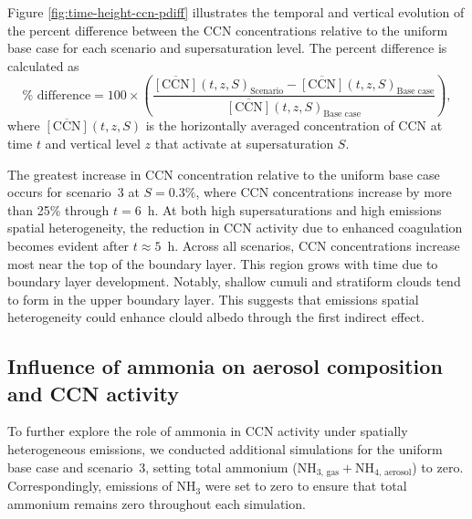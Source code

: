 \documentclass[journal abbreviation, manuscript]{copernicus}
\begin{document}
Figure \ref{fig:time-height-ccn-pdiff} illustrates the temporal and
vertical evolution of the percent difference between the CCN
concentrations relative to the uniform base case for each scenario and
supersaturation level. The percent difference is calculated as
\begin{equation}
    \% \text{ difference} = 100\times\left(\frac{\overline{[\text{CCN}]}(t, z, S)_{\text{Scenario}} - \overline{[\text{CCN}]}(t, z, S)_{\text{Base case}}}{\overline{[\text{CCN}]}(t, z, S)_{\text{Base case}}}\right),
\end{equation}
where $\overline{[\text{CCN}]}(t, z,S)$ is the horizontally averaged
concentration of CCN at time $t$ and vertical level $z$ that activate
at supersaturation $S$.

The greatest increase in CCN concentration relative to the uniform
base case occurs for scenario~3 at $S=0.3\%$, where CCN concentrations
increase by more than 25\% through $t=6$~h. At both high
supersaturations and high emissions spatial heterogeneity, the
reduction in CCN activity due to enhanced coagulation becomes evident
after $t\approx5$~h.  Across all scenarios, CCN concentrations
increase most near the top of the boundary layer. This region grows
with time due to boundary layer development. Notably, shallow cumuli
and stratiform clouds tend to form in the upper boundary layer. This
suggests that emissions spatial heterogeneity could enhance clould
albedo through the first indirect effect.



\subsection{Influence of ammonia on aerosol composition and CCN activity}\label{sec:influence-ammonia}

To further explore the role of ammonia in CCN activity under spatially
heterogeneous emissions, we conducted additional simulations for the
uniform base case and scenario~3, setting total ammonium
(NH$_{3\text{, gas}} + $NH$_{4\text{, aerosol}}$) to zero. Correspondingly, 
emissions of NH$_3$ were set to zero to ensure that total ammonium remains
zero throughout each simulation.
\end{document}
